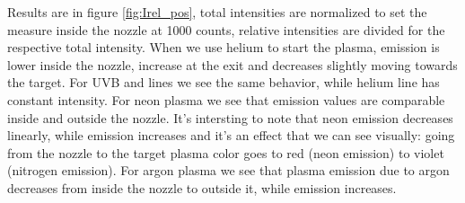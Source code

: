 Results are in figure \ref{fig:Irel_pos}, total intensities are normalized to set the measure inside the nozzle at \num{1000} counts, relative intensities are divided for the respective total intensity.
When we use helium to start the plasma, emission is lower inside the nozzle, increase at the exit and decreases slightly moving towards the target. For UVB and  lines we see the same behavior, while helium line has constant intensity.
For neon plasma we see that emission values are comparable inside and outside the nozzle. It's intersting to note that neon emission decreases linearly, while  emission increases and it's an effect that we can see visually: going from the nozzle to the target plasma color goes to red (neon emission) to violet (nitrogen emission).
For argon plasma we see that plasma emission due to argon decreases from inside the nozzle to outside it, while  emission increases.

